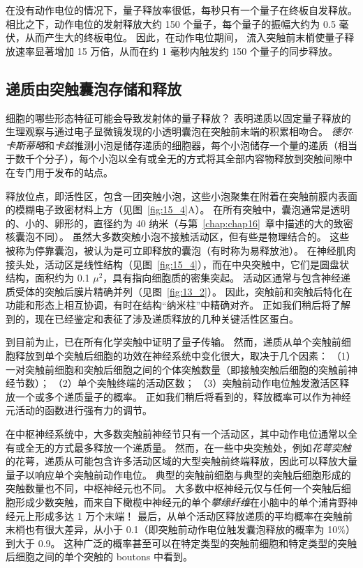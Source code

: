 在没有动作电位的情况下，量子释放率很低，每秒只有一个量子在终板自发释放。
相比之下，动作电位的发射释放大约 150 个量子，每个量子的振幅大约为 0.5 毫伏，从而产生大的终板电位。
因此，在动作电位期间， 流入突触前末梢使量子释放速率显著增加 15 万倍，从而在约 1 毫秒内触发约 150 个量子的同步释放。



\subsection{递质由突触囊泡存储和释放}

细胞的哪些形态特征可能会导致发射体的量子释放？
表明递质以固定量子释放的生理观察与通过电子显微镜发现的小透明囊泡在突触前末端的积累相吻合。
\textit{德尔$\cdot$卡斯蒂略}和\textit{卡兹}推测小泡是储存递质的细胞器，每个小泡储存一个量的递质（相当于数千个分子），每个小泡以全有或全无的方式将其全部内容物释放到突触间隙中 在专门用于发布的站点。


释放位点，即活性区，包含一团突触小泡，这些小泡聚集在附着在突触前膜内表面的模糊电子致密材料上方（见图~\ref{fig:15_4}A）。
在所有突触中，囊泡通常是透明的、小的、卵形的，直径约为 40 纳米（与第~\ref{chap:chap16}~章中描述的大的致密核囊泡不同）。
虽然大多数突触小泡不接触活动区，但有些是物理结合的。
这些被称为停靠囊泡，被认为是可立即释放的囊泡（有时称为易释放池）。
在神经肌肉接头处，活动区是线性结构（见图~\ref{fig:15_4}），而在中央突触中，它们是圆盘状结构，面积约为 0.1 $ \mu^2 $，具有指向细胞质的密集突起。
活动区通常与包含神经递质受体的突触后膜片精确并列（见图~\ref{fig:13_2}）。
因此，突触前和突触后特化在功能和形态上相互协调，有时在结构“纳米柱”中精确对齐。 
正如我们稍后将了解到的，现在已经鉴定和表征了涉及递质释放的几种关键活性区蛋白。


到目前为止，已在所有化学突触中证明了量子传输。
然而，递质从单个突触前细胞释放到单个突触后细胞的功效在神经系统中变化很大，取决于几个因素：
（1）一对突触前细胞和突触后细胞之间的个体突触数量（即接触突触后细胞的突触前神经节数）；
（2）单个突触终端的活动区数；
（3）突触前动作电位触发激活区释放一个或多个递质量子的概率。
正如我们稍后将看到的，释放概率可以作为神经元活动的函数进行强有力的调节。


在中枢神经系统中，大多数突触前神经节只有一个活动区，其中动作电位通常以全有或全无的方式最多释放一个递质量。
然而，在一些中央突触处，例如\textit{花萼突触}的花萼，递质从可能包含许多活动区域的大型突触前终端释放，因此可以释放大量量子以响应单个突触前动作电位。
典型的突触前细胞与典型的突触后细胞形成的突触数量也不同，中枢神经元也不同。
大多数中枢神经元仅与任何一个突触后细胞形成少数突触，而来自下橄榄中神经元的单个\textit{攀缘纤维}在小脑中的单个浦肯野神经元上形成多达 1 万个末端！
最后，从单个活动区释放递质的平均概率在突触前末梢也有很大差异，从小于 0.1（即突触前动作电位触发囊泡释放的概率为 10\%）到大于 0.9。
这种广泛的概率甚至可以在特定类型的突触前细胞和特定类型的突触后细胞之间的单个突触的 boutons 中看到。


